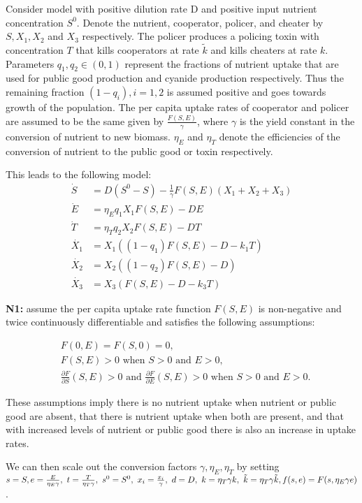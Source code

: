 \documentclass[12pt]{article}
\begin{document}
Consider model with positive dilution rate D and positive input nutrient concentration $S^0$. Denote the nutrient, cooperator, policer, and cheater by $S, X_1, X_2$ and $X_3$ respectively. The policer produces a policing toxin with concentration $T$ that kills cooperators at rate $\tilde{k}$ and kills cheaters at rate $k$. Parameters $q_1, q_2 \in (0,1)$ represent the fractions of nutrient uptake that are used for public good production and cyanide production respectively. Thus the remaining fraction $(1-q_i), i = 1,2$ is assumed positive and goes towards growth of the population. The per capita uptake rates of cooperator and policer are assumed to be the same given by $\frac{F(S,E)}{\gamma}$, where $\gamma$ is the yield constant in the conversion of nutrient to new biomass. $\eta_E$ and $\eta_T$ denote the efficiencies of the conversion of nutrient to the public good or toxin respectively. 

\noindent This leads to the following model: 
\begin{align*}
\dot{S}&=D(S^0-S)-\frac{1}{\gamma}F(S,E)(X_1 + X_2+X_3)\\
\dot{E}&=\eta_E q_1 X_1 F(S,E)-DE\\
\dot{T}&=\eta_T q_2 X_2 F(S,E) - DT\\
\dot{X_1} &= X_1((1-q_1)F(S,E)-D- k_1 T)\\
\dot{X_2}&=X_2((1-q_2)F(S,E)-D)\\
\dot{X_3}&=X_3(F(S,E)-D-k_3 T)
\end{align*}

\noindent \textbf{N1:} assume the per capita uptake rate function $F(S,E)$ is non-negative and twice continuously differentiable and satisfies the following assumptions: 

\begin{align*}
&F(0,E)=F(S,0)=0,\\
&F(S,E)>0 \text{ when } S>0 \text{ and } E>0,\\
&\frac{\partial F}{\partial S}(S,E)>0 \text{ and } \frac{\partial F}{\partial E}(S,E)>0 \text { when } S>0 \text{ and } E>0.
\end{align*}

\noindent These assumptions imply there is no nutrient uptake when nutrient or public good are absent, that there is nutrient uptake when both are present, and that with increased levels of nutrient or public good there is also an increase in uptake rates. 

\noindent We can then scale out the conversion factors $\gamma, \eta_E , \eta_T$ by setting $s=S,\\ e=\frac{E}{\eta_E \gamma},\text{ } t=\frac{T}{\eta_T \gamma}, \text{ } s^0=S^0, \text{ }x_i=\frac{x_i}{\gamma}, \text{ }d=D,\text{ }k=\eta_T \gamma k, \text{ } \tilde{k}=\eta_T \gamma \tilde{k},\\ f(s,e)=F(s,\eta_E \gamma e)$. 
\end{document}
